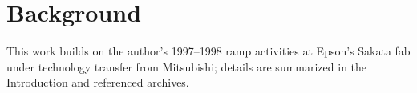 \section{Background}
This work builds on the author's 1997–1998 ramp activities at Epson's Sakata fab under technology transfer from Mitsubishi; details are summarized in the Introduction and referenced archives.

